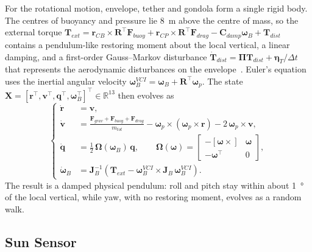\documentclass[preprint,12pt,a4paper]{elsarticle}
\begin{document}
For the rotational motion, envelope, tether and gondola form a single rigid body.
The centres of buoyancy and pressure lie \SI{8}{m} above the centre of mass, so the external
torque
$\mathbf{T}_{ext}=\mathbf{r}_{CB}\times\mathbf{R}^\top\mathbf{F}_{buoy}
+\mathbf{r}_{CP}\times\mathbf{R}^\top\mathbf{F}_{drag}
-\mathbf{C}_{damp}\boldsymbol{\omega}_B+\mathbf{T}_{dist}$
contains a pendulum-like restoring moment about the local vertical, a linear damping, and a
first-order Gauss--Markov disturbance
$\dot{\mathbf{T}}_{dist}=\boldsymbol{\Pi}\mathbf{T}_{dist}+\boldsymbol{\eta}_T/\Delta t$
that represents the aerodynamic disturbances on the envelope~\cite{Ploen2023}.
Euler's equation uses the inertial angular velocity
$\boldsymbol{\omega}_B^{VCI}=\boldsymbol{\omega}_B+\mathbf{R}^\top\boldsymbol{\omega}_p$.
The state $\mathbf{X}=[\mathbf{r}^\top,\mathbf{v}^\top,\mathbf{q}^\top,
\boldsymbol{\omega}_B^\top]^\top\in\mathbb{R}^{13}$ then evolves as
\begin{equation}
\left\{
\begin{aligned}
\dot{\mathbf{r}}&=\mathbf{v},\\
\dot{\mathbf{v}}&=\frac{\mathbf{F}_{grav}+\mathbf{F}_{buoy}+\mathbf{F}_{drag}}{m_{tot}}
-\boldsymbol{\omega}_p\times(\boldsymbol{\omega}_p\times\mathbf{r})
-2\,\boldsymbol{\omega}_p\times\mathbf{v},\\
\dot{\mathbf{q}}&=\tfrac12\,\boldsymbol{\Omega}(\boldsymbol{\omega}_B)\,\mathbf{q},
\qquad
\boldsymbol{\Omega}(\boldsymbol{\omega})=
\begin{bmatrix}-[\boldsymbol{\omega}\times] & \boldsymbol{\omega}\\
-\boldsymbol{\omega}^\top & 0\end{bmatrix},\\
\dot{\boldsymbol{\omega}}_B&=\mathbf{J}_B^{-1}\left(\mathbf{T}_{ext}
-\boldsymbol{\omega}_B^{VCI}\times\mathbf{J}_B\,\boldsymbol{\omega}_B^{VCI}\right).
\end{aligned}
\right.
\label{eq:dynamics}
\end{equation}
The result is a damped physical pendulum: roll and pitch stay within about \SI{1}{\degree}
of the local vertical, while yaw, with no restoring moment, evolves as a random walk.

\subsection{Sun Sensor}
\end{document}
